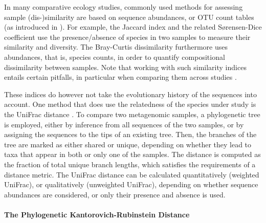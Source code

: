 In many comparative ecology studies, commonly used methods for assessing sample (dis-)similarity are based on
sequence abundances, or OTU count tables
(as introduced in ).
For example, the Jaccard index \cite{Jaccard1901} and the related S\o{}rensen-Dice coefficient \cite{Sorensen1948,Dice1945}
use the presence/absence of species in two samples to measure their similarity and diversity.
The Bray-Curtis dissimilarity \cite{Bray1957,Legendre1998} furthermore uses abundances,
that is, species counts, in order to quantify compositional dissimilarity between samples.
Note that working with such similarity indices entails certain pitfalls,
in particular when comparing them across studies \cite{Bloom1981}.

These indices do however not take the evolutionary history of the sequences into account.
One method that does use the relatedness of the species under study is the UniFrac distance \cite{Lozupone2005,Lozupone2007a}.
To compare two metagenomic samples, a phylogenetic tree is employed,
either by inference from all sequences of the two samples,
or by assigning the sequences to the tips of an existing tree.
Then, the branches of the tree are marked as either shared or unique,
depending on whether they lead to taxa that appear in both or only one of the samples.
The distance is computed as the fraction of total unique branch lengths,
which satisfies the requirements of a distance metric.
The UniFrac distance can be calculated quantitatively (weighted UniFrac), or qualitatively (unweighted UniFrac),
depending on whether sequence abundances are considered, or only their presence and absence is used.

\paragraph{The Phylogenetic Kantorovich-Rubinstein Distance}
\label{ch:Foundations:sec:PhylogeneticPlacement:sub:Distances:par:KR}

